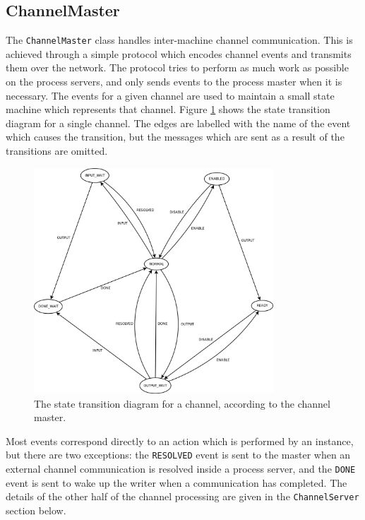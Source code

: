 \subsection{ChannelMaster}

The \texttt{ChannelMaster} class handles inter-machine channel communication.
This is achieved through a simple protocol which encodes channel events and
transmits them over the network. The protocol tries to perform as much work as
possible on the process servers, and only sends events to the process master
when it is necessary. The events for a given channel are used to maintain
a small state machine which represents that channel. Figure \ref{channel-master}
shows the state transition diagram for a single channel.  The edges are labelled
with the name of the event which causes the transition, but the messages which
are sent as a result of the transitions are omitted.

\begin{figure}[h]
  \centering
  \includegraphics[width=0.8\textwidth]{diagrams/channel_master}
  \caption{
    The state transition diagram for a channel, according to the channel
    master.
  }
  \label{channel-master}
\end{figure}

Most events correspond directly to an action which is performed by an instance,
but there are two exceptions: the \texttt{RESOLVED} event is sent to the master
when an external channel communication is resolved inside a process server, and
the \texttt{DONE} event is sent to wake up the writer when a communication has
completed. The details of the other half of the channel processing are given in
the \texttt{ChannelServer} section below.


